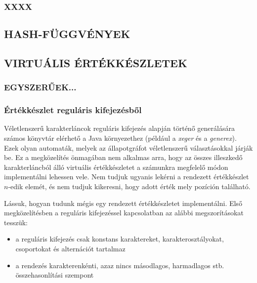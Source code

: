 \documentclass[
    parspace,
    noindent,
    nohyp,
]{elteiktdk}[2023/04/10]
\begin{document}
\subsubsection{XXXX}



\subsection{HASH-FÜGGVÉNYEK}


\subsection{VIRTUÁLIS ÉRTÉKKÉSZLETEK}

\subsubsection{EGYSZERŰEK...}


\subsubsection{Értékkészlet reguláris kifejezésből}

Véletlenszerű karakterláncok reguláris kifejezés alapján történő generálására
számos könyvtár elérhető a Java környezethez
(például a \textit{xeger} és a \textit{generex}).
Ezek olyan automaták, melyek az állapotgráfot véletlenszerű választásokkal járják be.
Ez a megközelítés önmagában nem alkalmas arra,
hogy az összes illeszkedő karakterláncból álló virtuális értékkészletet
a számunkra megfelelő módon implementálni lehessen vele.
Nem tudjuk ugyanis lekérni a rendezett értékkészlet $n$-edik elemét,
és nem tudjuk kikeresni, hogy adott érték mely pozíción található.

Lássuk, hogyan tudunk mégis egy rendezett értékkészletet implementálni.
Első megközelítésben a reguláris kifejezéssel kapcsolatban az alábbi megszorításokat tesszük:

\begin{itemize}
    \item a reguláris kifejezés csak konstans karaktereket, karakterosztályokat, csoportokat és alternációt tartalmaz
    \item a rendezés karakterenkénti, azaz nincs másodlagos, harmadlagos stb. összehasonlítási szempont
\end{itemize}
\end{document}
